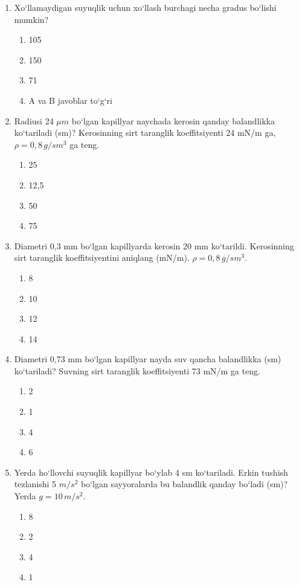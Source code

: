 \begin{enumerate}
\item Xo‘llamaydigan suyuqlik uchun xo‘llash burchagi necha gradus bo‘lishi mumkin?
\begin{enumerate}[label=\Alph*)]
\item 105
\item 150
\item 71
\item A va B javoblar to‘g‘ri
\end{enumerate}


\item Radiusi 24 $\mu m$ bo‘lgan kapillyar naychada kerosin qanday balandlikka ko‘tariladi (sm)? Kerosinning sirt taranglik koeffitsiyenti 24 mN/m ga, $\rho = 0,8 \, g/sm^3$ ga teng.
\begin{enumerate}[label=\Alph*)]
\item 25
\item 12,5
\item 50
\item 75
\end{enumerate}

\item Diametri 0,3 mm bo‘lgan kapillyarda kerosin 20 mm ko‘tarildi. Kerosinning sirt taranglik koeffitsiyentini aniqlang (mN/m). $\rho = 0,8 \, g/sm^3$.
\begin{enumerate}[label=\Alph*)]
\item 8
\item 10
\item 12
\item 14
\end{enumerate}

\item Diametri 0,73 mm bo‘lgan kapillyar nayda suv qancha balandlikka (sm) ko‘tariladi? Suvning sirt taranglik koeffitsiyenti 73 mN/m ga teng.
\begin{enumerate}[label=\Alph*)]
\item 2
\item 1
\item 4
\item 6
\end{enumerate}

\item Yerda ho‘llovchi suyuqlik kapillyar bo‘ylab 4 sm ko‘tariladi. Erkin tushish tezlanishi 5 $m/s^2$ bo‘lgan sayyoralarda bu balandlik qanday bo‘ladi (sm)? Yerda $g = 10 \, m/s^2$.
\begin{enumerate}[label=\Alph*)]
\item 8
\item 2
\item 4
\item 1
\end{enumerate}


\end{enumerate}
